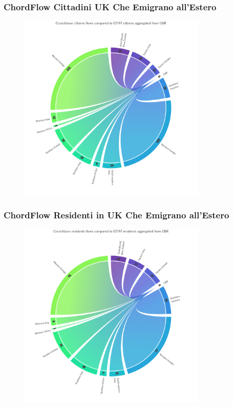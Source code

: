 
\subsubsection{ChordFlow Cittadini UK Che Emigrano all'Estero}
\begin{figure}[t]
    \centering
    \includegraphics[width=0.8\textwidth]{images/ChordFlows/filtered_nationality/gbr/Crunchbase_cit_ESTAT_True.png}
    
    \label{fig:chordgbr_cit_true}
\end{figure}
\subsubsection{ChordFlow Residenti in UK Che Emigrano all'Estero}
\begin{figure}[t]
    \centering
    \includegraphics[width=0.8\textwidth]{images/ChordFlows/filtered_nationality/gbr/Crunchbase_res_ESTAT_True.png}
    
    \label{fig:chordgbr_res_true}
\end{figure}

